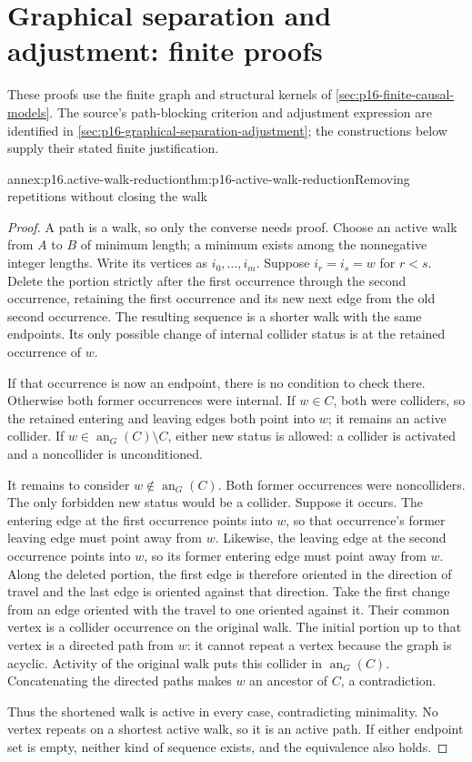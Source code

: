 \section{Graphical separation and adjustment: finite proofs}
\label{sec:annex-p16-graphical-separation-adjustment}

These proofs use the finite graph and structural kernels of
\cref{sec:p16-finite-causal-models}. The source's path-blocking criterion
and adjustment expression are identified in
\cref{sec:p16-graphical-separation-adjustment}; the constructions below
supply their stated finite justification.

\begin{annexitem}{annex:p16.active-walk-reduction}{thm:p16-active-walk-reduction}{Removing repetitions without closing the walk}
\begin{proof}
A path is a walk, so only the converse needs proof. Choose an active walk
from \(A\) to \(B\) of minimum length; a minimum exists among the
nonnegative integer lengths. Write its vertices as
\(i_0,\ldots,i_m\). Suppose \(i_r=i_s=w\) for \(r<s\).
Delete the portion strictly after the first occurrence through the second
occurrence, retaining the first occurrence and its new next edge from
the old second occurrence. The resulting sequence is a shorter walk
with the same endpoints. Its only possible change of internal collider
status is at the retained occurrence of \(w\).

If that occurrence is now an endpoint, there is no condition to check
there. Otherwise both former occurrences were internal. If \(w\in C\),
both were colliders, so the retained entering and leaving edges both
point into \(w\); it remains an active collider. If
\(w\in\operatorname{an}_G(C)\setminus C\), either new status is
allowed: a collider is activated and a noncollider is unconditioned.

It remains to consider \(w\notin\operatorname{an}_G(C)\).
Both former occurrences were noncolliders. The only forbidden new
status would be a collider. Suppose it occurs. The entering edge at
the first occurrence points into \(w\), so that occurrence's former
leaving edge must point away from \(w\). Likewise, the leaving edge
at the second occurrence points into \(w\), so its former entering
edge must point away from \(w\). Along the deleted portion, the
first edge is therefore oriented in the direction of travel and the
last edge is oriented against that direction. Take the first change
from an edge oriented with the travel to one oriented against it.
Their common vertex is a collider occurrence on the original walk.
The initial portion up to that vertex is a directed path from \(w\):
it cannot repeat a vertex because the graph is acyclic. Activity of
the original walk puts this collider in \(\operatorname{an}_G(C)\).
Concatenating the directed paths makes \(w\) an ancestor of \(C\),
a contradiction.

Thus the shortened walk is active in every case, contradicting
minimality. No vertex repeats on a shortest active walk, so it is an
active path. If either endpoint set is empty, neither kind of sequence
exists, and the equivalence also holds.
\end{proof}
\end{annexitem}

